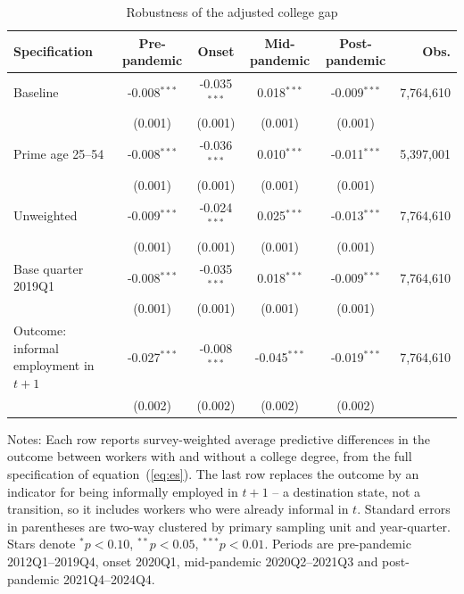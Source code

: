 \begin{table}[H]
\centering
\caption{Robustness of the adjusted college gap}
\label{tab:robustness}
\begin{threeparttable}
\small
\setlength{\tabcolsep}{4pt}
\begin{tabular}{lccccr}
\toprule
Specification & Pre-pandemic & Onset & Mid-pandemic & Post-pandemic & Obs. \\
\midrule
Baseline & -0.008$^{***}$ & -0.035$^{***}$ & 0.018$^{***}$ & -0.009$^{***}$ & 7,764,610 \\
 & (0.001) & (0.001) & (0.001) & (0.001) & \\
Prime age 25--54 & -0.008$^{***}$ & -0.036$^{***}$ & 0.010$^{***}$ & -0.011$^{***}$ & 5,397,001 \\
 & (0.001) & (0.001) & (0.001) & (0.001) & \\
Unweighted & -0.009$^{***}$ & -0.024$^{***}$ & 0.025$^{***}$ & -0.013$^{***}$ & 7,764,610 \\
 & (0.001) & (0.001) & (0.001) & (0.001) & \\
Base quarter 2019Q1 & -0.008$^{***}$ & -0.035$^{***}$ & 0.018$^{***}$ & -0.009$^{***}$ & 7,764,610 \\
 & (0.001) & (0.001) & (0.001) & (0.001) & \\
Outcome: informal employment in $t+1$ & -0.027$^{***}$ & -0.008$^{***}$ & -0.045$^{***}$ & -0.019$^{***}$ & 7,764,610 \\
 & (0.002) & (0.002) & (0.002) & (0.002) & \\
\bottomrule
\end{tabular}
\begin{tablenotes}[flushleft]\footnotesize
\item Notes: Each row reports survey-weighted average predictive differences in the outcome between workers with and without a college degree, from the full specification of equation~(\ref{eq:es}). The last row replaces the outcome by an indicator for being informally employed in $t+1$ -- a destination state, not a transition, so it includes workers who were already informal in $t$. Standard errors in parentheses are two-way clustered by primary sampling unit and year-quarter. Stars denote $^{*}p<0.10$, $^{**}p<0.05$, $^{***}p<0.01$. Periods are pre-pandemic 2012Q1--2019Q4, onset 2020Q1, mid-pandemic 2020Q2--2021Q3 and post-pandemic 2021Q4--2024Q4.
\end{tablenotes}
\end{threeparttable}
\end{table}
